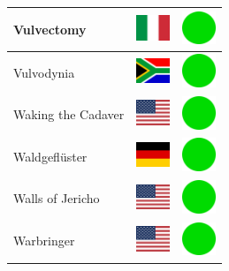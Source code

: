 \documentclass[12pt, a4paper, twoside]{report}
\begin{document}
\begin{center}
\begin{longtable}{|p{5cm}|p{2cm}|p{2cm}|}
 Vulvectomy                                                 & \includegraphics[width=1cm]{../img/flags/it} &   \includegraphics[width=1cm]{../likes/y} \\ \hline
 Vulvodynia                                                 & \includegraphics[width=1cm]{../img/flags/za} &   \includegraphics[width=1cm]{../likes/y} \\ \hline
 Waking the Cadaver                                         & \includegraphics[width=1cm]{../img/flags/us} &   \includegraphics[width=1cm]{../likes/y} \\ \hline
 Waldgeflüster                                              & \includegraphics[width=1cm]{../img/flags/de} &   \includegraphics[width=1cm]{../likes/y} \\ \hline
 Walls of Jericho                                           & \includegraphics[width=1cm]{../img/flags/us} &   \includegraphics[width=1cm]{../likes/y} \\ \hline
 Warbringer                                                 & \includegraphics[width=1cm]{../img/flags/us} &   \includegraphics[width=1cm]{../likes/y} \\ \hline

\end{longtable}
\end{center}
\end{document}

